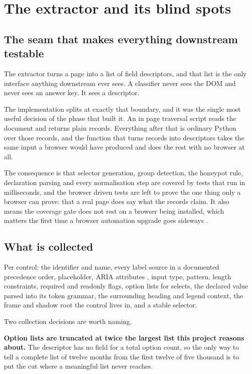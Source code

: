 \chapter{The extractor and its blind spots}
\label{ch:extractor}

\section{The seam that makes everything downstream testable}

The extractor turns a page into a list of field descriptors, and that list is
the only interface anything downstream ever sees. A classifier never sees the
DOM and never sees an answer key. It sees a descriptor.

The implementation splits at exactly that boundary, and it was the single most
useful decision of the phase that built it. An in page traversal script reads
the document and returns plain records. Everything after that is ordinary Python
over those records, and the function that turns records into descriptors takes
the same input a browser would have produced and does the rest with no browser
at all.

The consequence is that selector generation, group detection, the honeypot rule,
declaration parsing and every normalisation step are covered by tests that run
in milliseconds, and the browser driven tests are left to prove the one thing
only a browser can prove: that a real page does say what the records claim. It
also means the coverage gate does not rest on a browser being installed, which
matters the first time a browser automation upgrade goes sideways
\cite{playwright-python}.

\section{What is collected}

Per control: the identifier and name, every label source in a documented
precedence order, placeholder, ARIA attributes \cite{aria-apg}, input type,
pattern, length constraints, required and readonly flags, option lists for
selects, the declared  value parsed into its token grammar,
the surrounding heading and legend context, the frame and shadow root the
control lives in, and a stable selector.

Two collection decisions are worth naming.

\textbf{Option lists are truncated at twice the largest list this project
reasons about.} The descriptor has no field for a total option count, so the
only way to tell a complete list of twelve months from the first twelve of five
thousand is to put the cut where a meaningful list never reaches.

